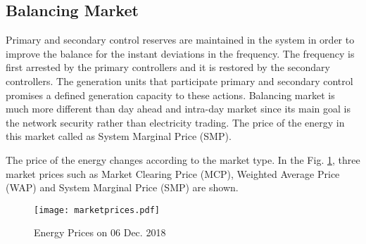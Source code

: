 \subsection{Balancing Market}
Primary and secondary control reserves are maintained in the system in order to improve the balance for the instant deviations in the frequency. The frequency is first arrested by the primary controllers and it is restored by the secondary controllers. The generation units that participate primary and secondary control promises a defined generation capacity to these actions. Balancing market is much more different than day ahead and intra-day market since its main goal is the network security rather than electricity trading. The price of the energy in this market called as System Marginal Price (SMP).\par
The price of the energy changes according to the market type. In the Fig. \ref{markets}, three market prices such as Market Clearing Price (MCP), Weighted Average Price (WAP) and System Marginal Price (SMP) are shown.
\begin{figure}[h!]
	\centering
	\texttt{[image: marketprices.pdf]}
	\caption{Energy Prices on 06 Dec. 2018 \cite{TEIAS2019}}
	\label{markets}
\end{figure}
